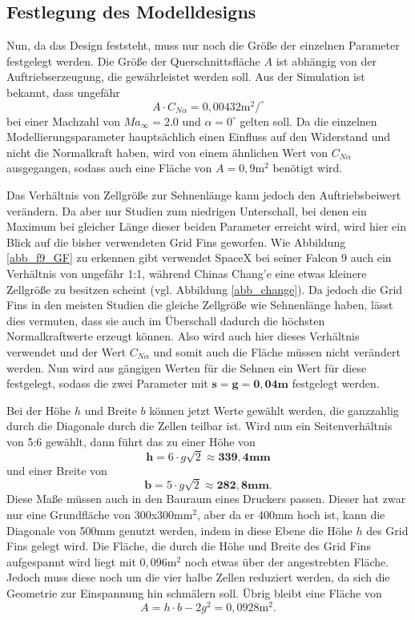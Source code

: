 \subsection{Festlegung des Modelldesigns}\label{sec:modelldesign}
Nun, da das Design feststeht, muss nur noch die Größe der einzelnen Parameter festgelegt werden. Die Größe der Querschnittsfläche $A$ ist abhängig von der Auftriebserzeugung, die gewährleistet werden soll. Aus der Simulation ist bekannt, dass ungefähr
\begin{equation}
	A \cdot C_{N\alpha}= 0,00432 \mathrm{m}^2/^\circ
\end{equation}
bei einer Machzahl von $Ma_\infty = 2.0$ und $\alpha = 0^\circ$ gelten soll. Da die einzelnen Modellierungsparameter hauptsächlich einen Einfluss auf den Widerstand und nicht die Normalkraft haben, wird von einem ähnlichen Wert von $C_{N\alpha}$ ausgegangen, sodass auch eine Fläche von $A=0,9\mathrm{m}^2$ benötigt wird.

Das Verhältnis von Zellgröße zur Sehnenlänge kann jedoch den Auftriebsbeiwert verändern. Da aber nur Studien zum niedrigen Unterschall, bei denen ein Maximum bei gleicher Länge dieser beiden Parameter erreicht wird, wird hier ein Blick auf die bisher verwendeten Grid Fins geworfen. Wie Abbildung \ref{abb_f9_GF} zu erkennen gibt verwendet SpaceX bei seiner Falcon 9 auch ein Verhältnis von ungefähr 1:1, während Chinas Chang'e eine etwas kleinere Zellgröße zu besitzen scheint (vgl. Abbildung \ref{abb_change}). Da jedoch die Grid Fins in den meisten Studien die gleiche Zellgröße wie Sehnenlänge haben, lässt dies vermuten, dass sie auch im Überschall dadurch die höchsten Normalkraftwerte erzeugt können. Also wird auch hier dieses Verhältnis verwendet und der Wert $C_{N\alpha}$ und somit auch die Fläche müssen nicht verändert werden. Nun wird aus gängigen Werten für die Sehnen ein Wert für diese festgelegt, sodass die zwei Parameter mit $\mathbf{s=g=0,04m}$ festgelegt werden.

Bei der Höhe $h$ und Breite $b$ können jetzt Werte gewählt werden, die ganzzahlig durch die Diagonale durch die Zellen teilbar ist. Wird nun ein Seitenverhältnis von 5:6 gewählt, dann führt das zu einer Höhe von \begin{equation}
	\mathbf{h= }6\cdot g\sqrt{2}\approx \mathbf{339,4mm}
\end{equation} 
und einer Breite von 
\begin{equation}
\mathbf{b= }5\cdot g\sqrt{2}\approx \mathbf{282,8mm}.
\end{equation}
 Diese Maße müssen auch in den Bauraum eines Druckers passen. Dieser hat zwar nur eine Grundfläche von 300x300mm$^2$, aber da er 400mm hoch ist, kann die Diagonale von 500mm genutzt werden, indem in diese Ebene die Höhe $h$ des Grid Fins gelegt wird. Die Fläche, die durch die Höhe und Breite des Grid Fins aufgespannt wird liegt mit $0,096\mathrm{m}^2$ noch etwas über der angestrebten Fläche. Jedoch muss diese noch um die vier halbe Zellen reduziert werden, da sich die Geometrie zur Einspannung hin schmälern soll. Übrig bleibt eine Fläche von \begin{equation}
 	A=h\cdot b-2g^2=0,0928\mathrm{m}^2.
 \end{equation}

